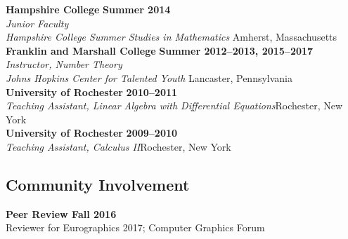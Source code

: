 {{\bf Hampshire College} \hfill {\bf Summer 2014}\\
{\em Junior Faculty\\
Hampshire College Summer Studies in Mathematics} \hfill  Amherst, Massachusetts\\

{\bf Franklin and Marshall College} \hfill {\bf Summer 2012--2013, 2015--2017}\\
{\em Instructor, Number Theory\\
Johns Hopkins Center for Talented Youth} \hfill Lancaster, Pennsylvania\\

{\bf University of Rochester} \hfill {\bf 2010--2011}\\
{\em Teaching Assistant, Linear Algebra with Differential Equations}\hfill  Rochester, New York\\

{\bf University of Rochester} \hfill {\bf 2009--2010}\\
{\em Teaching Assistant, Calculus II}\hfill  Rochester, New York\\

\subsection*{Community Involvement}
{\bf Peer Review \hfill Fall 2016}\\
Reviewer for Eurographics 2017; Computer Graphics Forum}
